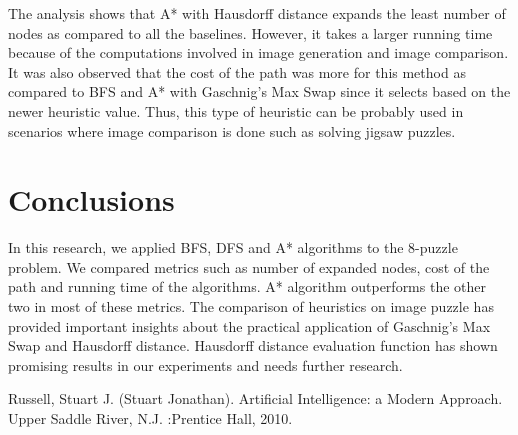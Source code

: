 \documentclass{svproc}
\begin{document}
\noindent  The analysis shows that A* with Hausdorff distance expands the least number of nodes as compared to all the baselines. However, it takes a larger running time because of the computations involved in image generation and image comparison. It was also observed that the cost of the path was more for this method as compared to BFS and A* with Gaschnig's Max Swap since it selects based on the newer heuristic value. Thus, this type of heuristic can be probably used in scenarios where image comparison is done such as solving jigsaw puzzles.

\section{Conclusions}
In this research, we applied BFS, DFS and A* algorithms to the 8-puzzle problem. We compared metrics such as number of expanded nodes, cost of the path and running time of the algorithms. A* algorithm outperforms the other two in most of these metrics. The comparison of heuristics on image puzzle has provided important insights about the practical application of Gaschnig's Max Swap and Hausdorff distance. Hausdorff distance evaluation function has shown promising results in our experiments and needs further research.

\begin{thebibliography}{6}
%

Russell, Stuart J. (Stuart Jonathan). Artificial Intelligence: a Modern Approach. Upper Saddle River, N.J.       :Prentice Hall, 2010.


\end{thebibliography}
\end{document}
